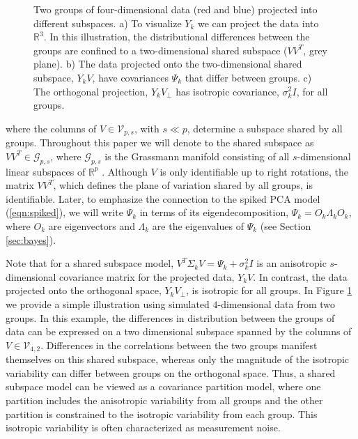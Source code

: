 \documentclass[12pt]{article}
\begin{document}
\begin{figure}[t]
    \centering
\quad
\quad 
{}
\caption{ Two groups of four-dimensional data (red and blue)
      projected into different subspaces.  a) To visualize $Y_k$ we
      can project the data into $\mathbb{R}^3$.  In this illustration, the
      distributional differences between the groups are confined to a
      two-dimensional shared subspace ($VV^T$, grey plane).  b) The
      data projected onto the two-dimensional shared subspace,
      $Y_kV$, have covariances $\Psi_k$ that differ between
      groups. c) The orthogonal projection, $Y_kV_{\perp}$
      has isotropic covariance, $\sigma_k^2I$, for all groups.  }
\label{fig:shared}
\end{figure}

%
\noindent where the columns of $V \in \mathcal{V}_{p, s}$, with
$s \ll p$, determine a subspace shared by all groups.  Throughout this
paper we will denote to the shared subspace as
$VV^T \in \mathcal G_{p,s}$, where $\mathcal G_{p,s}$ is the
Grassmann manifold consisting of all $s$-dimensional linear subspaces
of $\mathbb{R}^p$ \citep{Chikuse2012}.  Although $V$ is only
identifiable up to right rotations, the matrix $VV^T$, which defines
the plane of variation shared by all groups, is identifiable.  Later,
to emphasize the connection to the spiked PCA model
(\ref{eqn:spiked}), we will write $\Psi_k$ in terms of its
eigendecomposition, $\Psi_k = O_k\Lambda_kO_k$, where $O_k$ are
eigenvectors and $\Lambda_k$ are the eigenvalues of $\Psi_k$ (see
Section \ref{sec:bayes}).

Note that for a shared subspace model,
$V^T\Sigma_kV = \Psi_k + \sigma_k^2I$ is an anisotropic
$s$-dimensional covariance matrix for the projected data, $Y_kV$.  In
contrast, the data projected onto the orthogonal space,
$Y_kV_{\perp}$, is isotropic for all groups.  In Figure
\ref{fig:shared} we provide a simple illustration using simulated
$4$-dimensional data from two groups.  In this example, the
differences in distribution between the groups of data can be
expressed on a two dimensional subspace spanned by the columns of
$V \in \mathcal{V}_{4, 2}$.  Differences in the correlations between
the two groups manifest themselves on this shared subspace, whereas
only the magnitude of the isotropic variability can differ between
groups on the orthogonal space.  Thus, a shared subspace model
can be viewed as a covariance partition model, where one partition
includes the anisotropic variability from all groups and the other
partition is constrained to the isotropic variability from each group.
This isotropic variability is often characterized as measurement
noise.
\end{document}
